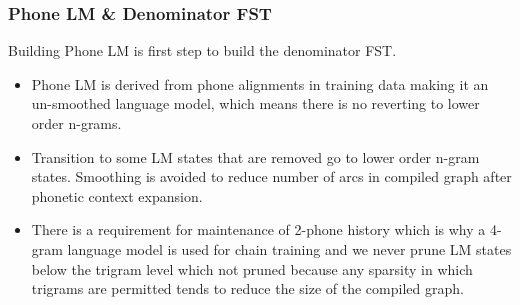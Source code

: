 \subsubsection{Phone LM \& Denominator FST} 
Building Phone LM is first step to build the denominator FST. 
    \begin{itemize}
        \item Phone LM is derived from phone alignments in training data making it an un-smoothed language model, which means there is no reverting to lower order n-grams. 
        \item Transition to some LM states that are removed go to lower order n-gram states. Smoothing is avoided to reduce number of arcs in compiled graph after phonetic context expansion.
        \item There is a requirement for maintenance of 2-phone history which is why a 4-gram language model is used for chain training and we never prune LM states below the trigram level which not pruned because any sparsity in which trigrams are permitted tends to reduce the size of the compiled graph.
    \end{itemize}




